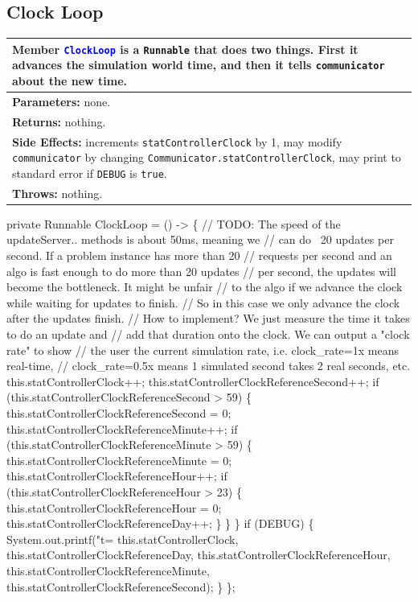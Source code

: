 \subsection{Clock Loop}
\begin{tabular}{p{\textwidth}}
\toprule
\rowcolor{TableTitle}
Member \textcolor{blue}{{\tt{}ClockLoop}} is a {\tt{}Runnable} that does two things.
First it advances the simulation world time, and then it tells {\tt{}communicator}
about the new time.\\
\midrule
\textbf{Parameters:} none.\\
\textbf{Returns:} nothing.\\
\textbf{Side Effects:} increments {\tt{}statControllerClock} by 1, may modify
{\tt{}communicator} by changing {\tt{}Communicator.statControllerClock}, may print to
standard error if {\tt{}DEBUG} is {\tt{}true}.\\
\textbf{Throws:} nothing.\\
\bottomrule
\end{tabular}
\nwenddocs{}\endmoddef{}
private Runnable ClockLoop = () -> \{
  // TODO: The speed of the updateServer.. methods is about 50ms, meaning we
  // can do ~20 updates per second. If a problem instance has more than 20
  // requests per second and an algo is fast enough to do more than 20 updates
  // per second, the updates will become the bottleneck. It might be unfair
  // to the algo if we advance the clock while waiting for updates to finish.
  // So in this case we only advance the clock after the updates finish.
  // How to implement? We just measure the time it takes to do an update and
  // add that duration onto the clock. We can output a "clock rate" to show
  // the user the current simulation rate, i.e. clock_rate=1x means real-time,
  // clock_rate=0.5x means 1 simulated second takes 2 real seconds, etc.
  this.statControllerClock++;
  this.statControllerClockReferenceSecond++;
  if (this.statControllerClockReferenceSecond > 59) \{
    this.statControllerClockReferenceSecond = 0;
    this.statControllerClockReferenceMinute++;
    if (this.statControllerClockReferenceMinute > 59) \{
      this.statControllerClockReferenceMinute = 0;
      this.statControllerClockReferenceHour++;
      if (this.statControllerClockReferenceHour > 23) \{
        this.statControllerClockReferenceHour = 0;
        this.statControllerClockReferenceDay++;
      \}
    \}
  \}
  if (DEBUG) \{
    System.out.printf("t=%
        this.statControllerClock,
        this.statControllerClockReferenceDay,
        this.statControllerClockReferenceHour,
        this.statControllerClockReferenceMinute,
        this.statControllerClockReferenceSecond);
  \}
\};
\nwendcode{}\nwdocspar

